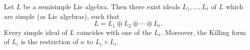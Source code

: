 Let $L$ be a semisimple Lie algebra. Then there exist ideals $L_1, \ldots, L_t$ of $L$ which are simple (as Lie algebras), such that
$$L = L_1 \oplus L_2 \oplus \cdots \oplus L_t.$$
Every simple ideal of $L$ coincides with one of the $L_i$. Moreover, the Killing form of $L_i$ is the restriction of $\kappa$ to $L_i \times L_i$.
